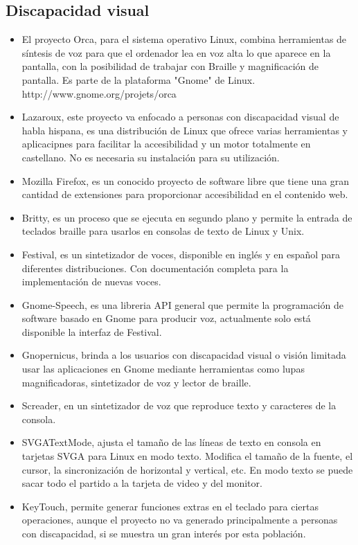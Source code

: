 \documentclass[a4paper]{article}
\begin{document}
\subsection{Discapacidad visual}
\begin{itemize}
\item El proyecto Orca, para el sistema operativo Linux, combina herramientas de síntesis de voz para que el ordenador lea en voz alta lo que aparece en la pantalla, con la posibilidad de trabajar con Braille y magnificación de pantalla. Es parte de la plataforma "Gnome" de Linux. 
http://www.gnome.org/projets/orca
\item Lazaroux, este proyecto va enfocado a personas con discapacidad visual de habla hispana, es una distribución de Linux que ofrece varias herramientas y aplicacipnes para facilitar la accesibilidad y un motor totalmente en castellano. No es necesaria su instalación para su utilización.
\item Mozilla Firefox, es un conocido proyecto de software libre que tiene una gran cantidad de extensiones para proporcionar accesibilidad en el contenido web.
\item Britty, es un proceso que se ejecuta en segundo plano y permite la entrada de teclados braille para usarlos en consolas de texto de Linux y Unix.
\item Festival, es un sintetizador de voces, disponible en inglés y en español para diferentes distribuciones. Con documentación completa para la implementación de nuevas voces.
\item Gnome-Speech, es una libreria API general que permite la programación de software basado en Gnome para producir voz, actualmente solo está disponible la interfaz de Festival.
\item Gnopernicus, brinda a los usuarios con discapacidad visual o visión limitada usar las aplicaciones en Gnome mediante herramientas como lupas magnificadoras, sintetizador de voz y lector de braille.
\item Screader, en un sintetizador de voz que reproduce texto y caracteres de la consola.
\item SVGATextMode, ajusta el tamaño de las líneas de texto en consola en tarjetas SVGA para Linux en modo texto. Modifica el tamaño de la fuente, el cursor, la sincronización de horizontal y vertical, etc. En modo texto se puede sacar todo el partido a la tarjeta de video y del monitor. 
\item KeyTouch, permite generar funciones extras en el teclado para ciertas operaciones, aunque el proyecto no va generado principalmente a personas con discapacidad, si se muestra un gran interés por esta población.
\end{itemize}
\end{document}
